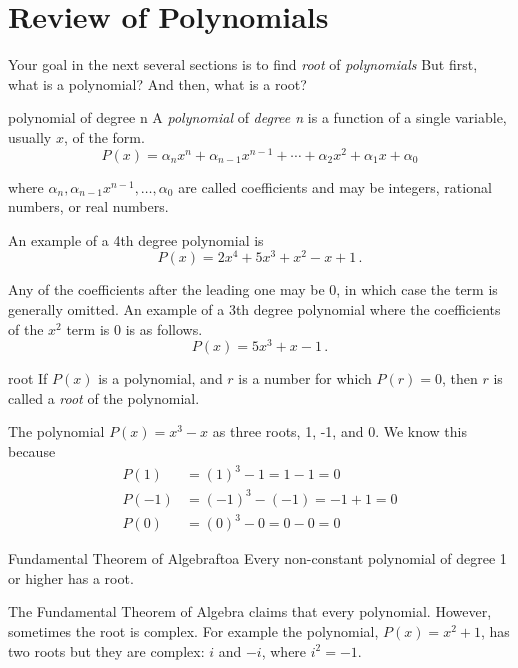 \section{Review of Polynomials}
\label{sec.general}

Your goal in the next several sections is to find \emph{root} of \emph{polynomials}
But first, what is a polynomial? And then, what is a root?

\begin{definition}{polynomial of degree n}{}
  A \emph{polynomial} of \emph{degree n} is a function of a single variable, usually $x$,
  of the form.
  \[P(x) = \alpha_n x^n + \alpha_{n-1} x^{n-1} + \cdots + \alpha_2 x^2 + \alpha_1 x + \alpha_0 \]

  where $\alpha_n,  \alpha_{n-1} x^{n-1}, \ldots, \alpha_0$ are called coefficients and may be integers, rational numbers, or real numbers.
\end{definition}

An example of a 4th degree polynomial is
\[P(x) = 2 x^4 + 5 x^3 + x^2 - x + 1\,.\]


Any of the coefficients after the leading one may be 0, in which case the term is generally omitted.
An example of a 3th degree polynomial where the coefficients of the $x^2$ term is 0 is as follows.
\[P(x) = 5 x^3 + x - 1\,.\]

\begin{definition}{root}{}
  If $P(x)$ is a polynomial, and $r$ is a number for which $P(r)=0$, then $r$ is called a \emph{root}
  of the polynomial.
\end{definition}

The polynomial $P(x) = x^3 - x$ as three roots, 1, -1, and 0.  We know this because
\begin{align*}
  P(1) &= (1)^3 - 1 
  = 1 - 1 
  = 0\\[3pt]
  P(-1) &= (-1)^3 - (-1) 
  = -1 + 1 
  = 0\\[3pt]
  P(0) &= (0)^3 - 0
  = 0 - 0 
  = 0  
\end{align*}

\begin{theorem}{Fundamental Theorem of Algebra}{ftoa}
  Every non-constant polynomial of degree 1 or higher has a root.
\end{theorem}

The Fundamental Theorem of Algebra claims that every polynomial.  However, sometimes the root is complex.
For example the polynomial, $P(x) = x^2 + 1$, has two roots but they are complex: $i$ and $-i$, where $i^2= -1$.

